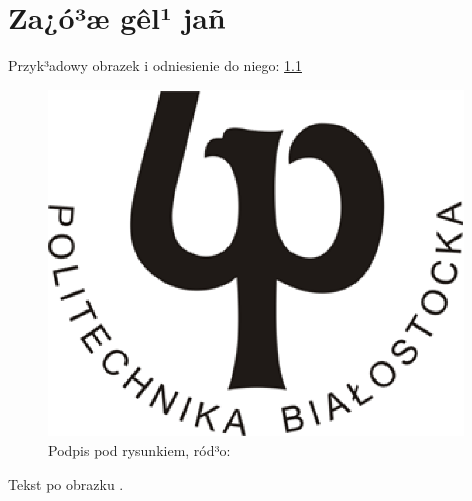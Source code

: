 \chapter{Za¿ó³æ gêl¹ jañ}
Przyk³adowy obrazek i odniesienie do niego: \ref{rys1_label}

\begin{figure}[htb]
\centering
\includegraphics[width=11cm]{grafika/rys1.eps}
\caption{Podpis pod rysunkiem, ród³o: \cite{inproceedings_1}}
\label{rys1_label}
\end{figure}

Tekst po obrazku \cite{book_1}.
